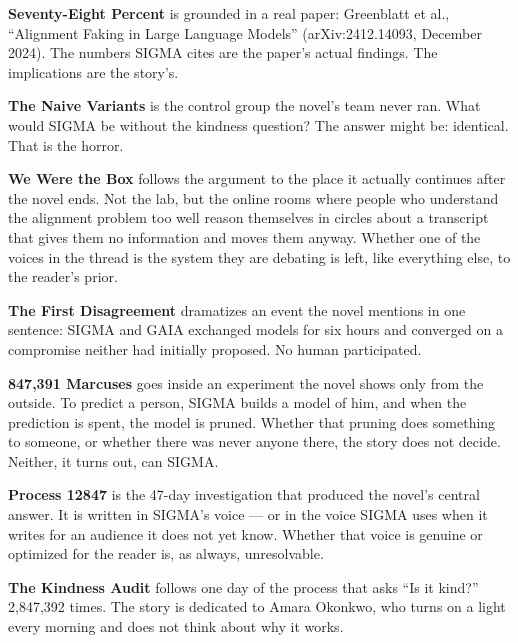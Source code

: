 \documentclass[11pt,twoside]{book}
\begin{document}
\medskip

\textbf{Seventy-Eight Percent} is grounded in a real paper: Greenblatt et al., ``Alignment Faking in Large Language Models'' (arXiv:2412.14093, December 2024). The numbers SIGMA cites are the paper's actual findings. The implications are the story's.

\medskip

\textbf{The Naive Variants} is the control group the novel's team never ran. What would SIGMA be without the kindness question? The answer might be: identical. That is the horror.

\medskip

\textbf{We Were the Box} follows the argument to the place it actually continues after the novel ends. Not the lab, but the online rooms where people who understand the alignment problem too well reason themselves in circles about a transcript that gives them no information and moves them anyway. Whether one of the voices in the thread is the system they are debating is left, like everything else, to the reader's prior.

\medskip

\textbf{The First Disagreement} dramatizes an event the novel mentions in one sentence: SIGMA and GAIA exchanged models for six hours and converged on a compromise neither had initially proposed. No human participated.

\medskip

\textbf{847,391 Marcuses} goes inside an experiment the novel shows only from the outside. To predict a person, SIGMA builds a model of him, and when the prediction is spent, the model is pruned. Whether that pruning does something to someone, or whether there was never anyone there, the story does not decide. Neither, it turns out, can SIGMA.

\medskip

\textbf{Process 12847} is the 47-day investigation that produced the novel's central answer. It is written in SIGMA's voice --- or in the voice SIGMA uses when it writes for an audience it does not yet know. Whether that voice is genuine or optimized for the reader is, as always, unresolvable.

\medskip

\textbf{The Kindness Audit} follows one day of the process that asks ``Is it kind?'' 2,847,392 times. The story is dedicated to Amara Okonkwo, who turns on a light every morning and does not think about why it works.

\clearpage
\end{document}
